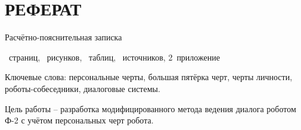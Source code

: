 \chapter*{РЕФЕРАТ}
 
\setcounter{page}{5}
 
Расчётно-пояснительная записка
\begin{NoHyper}\pageref{LastPage}\end{NoHyper}~страниц,
\totfig~рисунков,
\tottab~таблиц,
\thetotbibentries~источников,
2~приложение

Ключевые слова: персональные черты, большая пятёрка черт, черты личности, роботы-собеседники, диалоговые системы.

Цель работы -- разработка модифицированного метода ведения диалога роботом Ф-2 с учётом персональных черт робота.